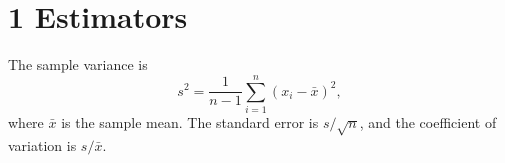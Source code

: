 \documentclass{article}
\begin{document}
\section*{1 Estimators}

The sample variance is
\[
s^2 = \frac{1}{n-1} \sum_{i=1}^{n} (x_i - \bar{x})^2,
\]
where $\bar{x}$ is the sample mean. The standard error is $s/\sqrt{n}$, and the coefficient of variation is $s/\bar{x}$.
\end{document}
